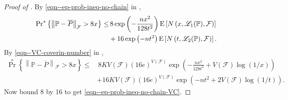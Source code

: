 \begin{proof}[Proof of ]
By \eqref{eqn--ep-prob-ineq-no-chain} in ,
\begin{equation*}
  \begin{split}
    \mathrm{Pr}^{\ast} \left\{ \left\| \mathbb{P} - \overline{P}
    \right\|_{\mathcal{F}} > 8 x \right\} \leq
    & \, 8 \exp \left( - \frac{n x^{2}}{128 t^{2}} \right) \mathrm{E} \left[ N \left( x,
    \mathscr{L}_{1} (\mathbb{P}), \mathcal{F} \right) \right] \\
    & + 16 \exp \left( - n t^{2} \right) \mathrm{E} \left[ N \left( t, \mathscr{L}_{2}
    (\mathbb{P}), \mathcal{F} \right) \right].
  \end{split}
\end{equation*}
By \eqref{eqn--VC-coverin-number} in ,
\begin{equation*}
  \begin{split}
    \Pr^{\ast} \left\{ \left\| \mathbb{P} - \overline{P}
    \right\|_{\mathcal{F}} > 8 x \right\} \leq
    & \, 8 K V (\mathcal{F}) (16 e)^{V (\mathcal{F})} \exp \left( - \frac{n
    x^{2}}{128 t^{2}} + V (\mathcal{F}) \log (1 / x) \right) \\
    & + 16 K V (\mathcal{F}) (16 e)^{V (\mathcal{F})} \exp \left( - n t^{2} + 2
    V (\mathcal{F}) \log (1 / t) \right).
  \end{split}
\end{equation*}
Now bound 8 by 16 to get \eqref{eqn--ep-prob-ineq-no-chain-VC}.
\end{proof}

